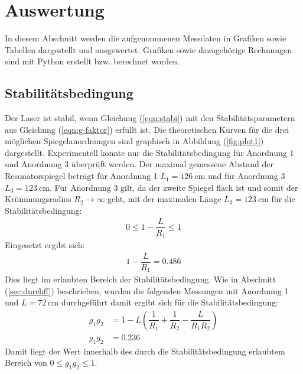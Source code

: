 
\section{Auswertung}
\label{sec:Auswertung}
In diesem Abschnitt werden die aufgenommenen Messdaten in Grafiken sowie Tabellen dargestellt und ausgewertet. Grafiken sowie dazugehörige Rechnungen sind mit Python \cite{python} erstellt bzw. berechnet worden.
\subsection{Stabilitätsbedingung}
\label{sec:stab}

Der Laser ist stabil, wenn Gleichung (\ref{eqn:stabi}) mit den Stabilitätsparametern aus Gleichung (\ref{eqn:g-faktor}) erfüllt ist.
Die theoretischen Kurven für die drei möglichen Spiegelanordnungen sind graphisch in Abbildung (\ref{fig:plot1}) dargestellt.
Experimentell konnte nur die Stabilitätsbedingung für Anordnung 1 und Anordnung 3 überprüft werden.
Der maximal gemessene Abstand der Resonatorspiegel beträgt für Anordnung 1 $L_\mathrm{1} = \SI{126}{\centi\meter}$ und für Anordnung 3 $L_\mathrm{3} = \SI{123}{\centi\meter}$.
Für Anordnung 3 gilt, da der zweite Spiegel flach ist und somit der Krümmungsradius $R_\mathrm{2}\rightarrow\infty$ geht, mit der maximalen Länge $L_\mathrm{3} = \SI{123}{\centi\meter}$ für die Stabilitätsbedingung:
\begin{align*}
  0\leq1-\dfrac{L}{R_\mathrm{1}}\leq1
\end{align*}
Eingesetzt ergibt sich:
\begin{align*}
  1-\dfrac{L}{R_\mathrm{1}}=0.486
\end{align*}
Dies liegt im erlaubten Bereich der Stabilitätsbedingung.
Wie in Abschnitt (\ref{sec:durchff}) beschrieben, wurden die folgenden Messungen mit Anordnung 1 und $L=\SI{72}{\centi\meter}$ durchgeführt damit ergibt sich für die Stabilitätsbedingung:
\begin{align*}
  g_\mathrm{1}g_\mathrm{2}&=1-L\left(\dfrac{1}{R_\mathrm{1}}+\dfrac{1}{R_\mathrm{2}}-\dfrac{L}{R_\mathrm{1}R_\mathrm{2}}\right) \\
  g_\mathrm{1}g_\mathrm{2}&=0.236
\end{align*}
Damit liegt der Wert innerhalb des durch die Stabilitätsbedingung erlaubtem Bereich von $0\leq g_\mathrm{1}g_\mathrm{2}\leq1$.
